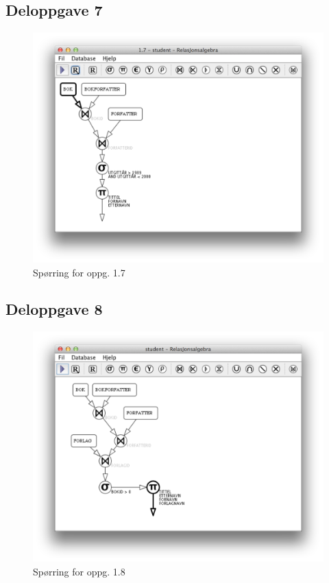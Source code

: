 \documentclass[a4paper, 12pt] {article}
\begin{document}
\subsection{Deloppgave 7}
\begin{figure}[h!]
    \includegraphics[width=\linewidth]{img/1-7.png}
    \caption{Spørring for oppg. 1.7 \label{img:1.7}}
\end{figure}
\newpage

\subsection{Deloppgave 8}
\begin{figure}[h!]
    \includegraphics[width=\linewidth]{img/1-8.png}
    \caption{Spørring for oppg. 1.8 \label{img:1.8}}
\end{figure}
\newpage
\end{document}
